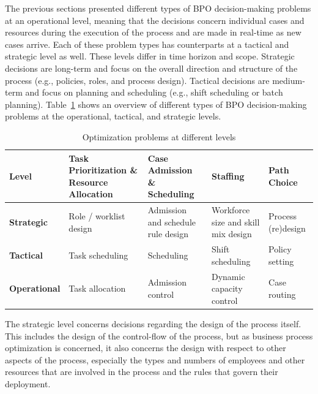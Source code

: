 \documentclass[runningheads]{llncs}
\begin{document}
The previous sections presented different types of BPO decision-making problems at an operational level, meaning that the decisions concern individual cases and resources during the execution of the process and are made in real-time as new cases arrive. Each of these problem types has counterparts at a tactical and strategic level as well. These levels differ in time horizon and scope. Strategic decisions are long-term and focus on the overall direction and structure of the process (e.g., policies, roles, and process design). Tactical decisions are medium-term and focus on planning and scheduling (e.g., shift scheduling or batch planning). Table~\ref{tab:levels} shows an overview of different types of BPO decision-making problems at the operational, tactical, and strategic levels.
\begin{table}[t]
\caption{Optimization problems at different levels}
\label{tab:levels}
\small
\setlength{\tabcolsep}{6pt}
\renewcommand{\arraystretch}{1.25}
\begin{tabularx}{\textwidth}{
  @{}
  l
  >{\raggedright\arraybackslash}X
  >{\raggedright\arraybackslash}X
  >{\raggedright\arraybackslash}X
  >{\raggedright\arraybackslash}X
  @{}
}
\toprule
\textbf{Level} &
\textbf{Task Prioritization \& Resource Allocation} &
\textbf{Case Admission \& Scheduling} &
\textbf{Staffing} &
\textbf{Path Choice} \\
\midrule
\textbf{Strategic} &
Role / worklist design &
Admission and schedule rule design &
Workforce size and skill mix design &
Process (re)design \\

\textbf{Tactical} &
Task scheduling &
Scheduling &
Shift scheduling &
Policy setting \\

\textbf{Operational} &
Task allocation &
Admission control &
Dynamic capacity control &
Case routing \\
\bottomrule
\end{tabularx}
\end{table}


The strategic level concerns decisions regarding the design of the process itself. This includes the design of the control-flow of the process, but as business process optimization is concerned, it also concerns the design with respect to other aspects of the process, especially the types and numbers of employees and other resources that are involved in the process and the rules that govern their deployment. 
\end{document}
